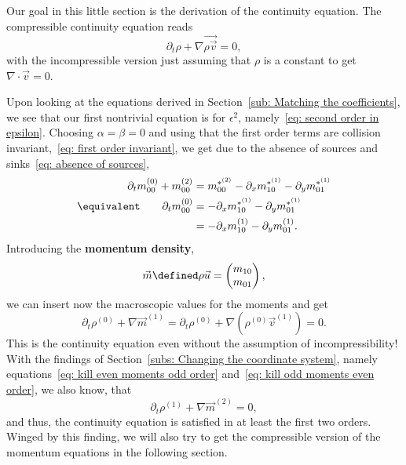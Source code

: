 Our goal in this little section is the derivation of the continuity equation.
The compressible continuity equation reads
\begin{equation}
  \label{eq: continuity equation}
  \partial_t \rho + \nabla \vec{\rho \vec{v}} = 0,
\end{equation}
with the incompressible version just assuming that $\rho$ is a constant to get $\nabla\cdot\vec{v}=0$.

Upon looking at the equations derived in Section~\ref{sub: Matching the coefficients}, we see that our first nontrivial equation is for $\epsilon^2$, namely~\eqref{eq: second order in epsilon}.
Choosing $\alpha=\beta=0$ and using that the first order terms are collision invariant,~\eqref{eq: first order invariant}, we get due to the absence of sources and sinks~\eqref{eq: absence of sources},
\begin{align}
  \nonumber
  \partial_t m_{00}^{(0)} + m_{00}^{(2)} & =  m_{00}^{*^{(2)}} - \partial_x m_{10}^{*^{(1)}} - \partial_y m_{01}^{*^{(1)}} \\
  \equivalent \qquad \partial_t m_{00}^{(0)} & =  - \partial_x m_{10}^{*^{(1)}} - \partial_y m_{01}^{*^{(1)}} \nonumber
  \\
  & =  - \partial_x m_{10}^{(1)} - \partial_y m_{01}^{(1)}.
  \label{eq: continuity moments}
\end{align}
Introducing the \textbf{momentum density},
\begin{equation}
  \vec{m} \defined \rho \vec{u} = \begin{pmatrix}m_{10} \\m_{01}  \end{pmatrix},
\end{equation}
we can insert now the macroscopic values for the moments and get
\begin{equation}
  \partial_t \rho^{(0)} + \nabla \vec{m}^{(1)} =
  \partial_t \rho^{(0)} + \nabla (\rho^{(0)} \vec{v}^{(1)}) = 0.
\end{equation}
This is the continuity equation even without the assumption of incompressibility!
With the findings of Section~\ref{subs: Changing the coordinate system},
namely equations~\eqref{eq: kill even moments odd order} and~\eqref{eq: kill odd moments even order}, we also know, that
\begin{equation}
  \label{eq: conti second order}
  \partial_t \rho^{(1)} + \nabla \vec{m}^{(2)} = 0,
\end{equation}
and thus, the continuity equation is satisfied in at least the first two orders.
Winged by this finding, we will also try to get the compressible version of the momentum equations in the following section.


